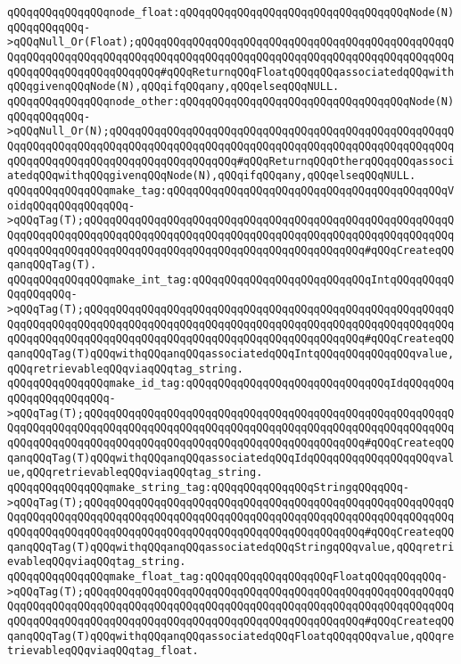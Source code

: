 \verb|qQQqqQQqqQQqqQQqnode_float:qQQqqQQqqQQqqQQqqQQqqQQqqQQqqQQqqQQqNode(N)qQQqqQQqqQQq->qQQqNull_Or(Float);qQQqqQQqqQQqqQQqqQQqqQQqqQQqqQQqqQQqqQQqqQQqqQQqqQQqqQQqqQQqqQQqqQQqqQQqqQQqqQQqqQQqqQQqqQQqqQQqqQQqqQQqqQQqqQQqqQQqqQQqqQQqqQQqqQQqqQQqqQQqqQQq#qQQqReturnqQQqFloatqQQqqQQqassociatedqQQqwithqQQqgivenqQQqNode(N),qQQqifqQQqany,qQQqelseqQQqNULL.|\newline
\verb|qQQqqQQqqQQqqQQqnode_other:qQQqqQQqqQQqqQQqqQQqqQQqqQQqqQQqqQQqNode(N)qQQqqQQqqQQq->qQQqNull_Or(N);qQQqqQQqqQQqqQQqqQQqqQQqqQQqqQQqqQQqqQQqqQQqqQQqqQQqqQQqqQQqqQQqqQQqqQQqqQQqqQQqqQQqqQQqqQQqqQQqqQQqqQQqqQQqqQQqqQQqqQQqqQQqqQQqqQQqqQQqqQQqqQQqqQQqqQQqqQQqqQQq#qQQqReturnqQQqOtherqQQqqQQqassociatedqQQqwithqQQqgivenqQQqNode(N),qQQqifqQQqany,qQQqelseqQQqNULL.|\newline
\newline
\verb|qQQqqQQqqQQqqQQqmake_tag:qQQqqQQqqQQqqQQqqQQqqQQqqQQqqQQqqQQqqQQqqQQqVoidqQQqqQQqqQQqqQQq->qQQqTag(T);qQQqqQQqqQQqqQQqqQQqqQQqqQQqqQQqqQQqqQQqqQQqqQQqqQQqqQQqqQQqqQQqqQQqqQQqqQQqqQQqqQQqqQQqqQQqqQQqqQQqqQQqqQQqqQQqqQQqqQQqqQQqqQQqqQQqqQQqqQQqqQQqqQQqqQQqqQQqqQQqqQQqqQQqqQQqqQQqqQQqqQQq#qQQqCreateqQQqanqQQqTag(T).|\newline
\verb|qQQqqQQqqQQqqQQqmake_int_tag:qQQqqQQqqQQqqQQqqQQqqQQqqQQqIntqQQqqQQqqQQqqQQqqQQq->qQQqTag(T);qQQqqQQqqQQqqQQqqQQqqQQqqQQqqQQqqQQqqQQqqQQqqQQqqQQqqQQqqQQqqQQqqQQqqQQqqQQqqQQqqQQqqQQqqQQqqQQqqQQqqQQqqQQqqQQqqQQqqQQqqQQqqQQqqQQqqQQqqQQqqQQqqQQqqQQqqQQqqQQqqQQqqQQqqQQqqQQqqQQqqQQq#qQQqCreateqQQqanqQQqTag(T)qQQqwithqQQqanqQQqassociatedqQQqIntqQQqqQQqqQQqqQQqvalue,qQQqretrievableqQQqviaqQQqtag_string.|\newline
\verb|qQQqqQQqqQQqqQQqmake_id_tag:qQQqqQQqqQQqqQQqqQQqqQQqqQQqqQQqIdqQQqqQQqqQQqqQQqqQQqqQQq->qQQqTag(T);qQQqqQQqqQQqqQQqqQQqqQQqqQQqqQQqqQQqqQQqqQQqqQQqqQQqqQQqqQQqqQQqqQQqqQQqqQQqqQQqqQQqqQQqqQQqqQQqqQQqqQQqqQQqqQQqqQQqqQQqqQQqqQQqqQQqqQQqqQQqqQQqqQQqqQQqqQQqqQQqqQQqqQQqqQQqqQQqqQQqqQQq#qQQqCreateqQQqanqQQqTag(T)qQQqwithqQQqanqQQqassociatedqQQqIdqQQqqQQqqQQqqQQqqQQqvalue,qQQqretrievableqQQqviaqQQqtag_string.|\newline
\verb|qQQqqQQqqQQqqQQqmake_string_tag:qQQqqQQqqQQqqQQqStringqQQqqQQq->qQQqTag(T);qQQqqQQqqQQqqQQqqQQqqQQqqQQqqQQqqQQqqQQqqQQqqQQqqQQqqQQqqQQqqQQqqQQqqQQqqQQqqQQqqQQqqQQqqQQqqQQqqQQqqQQqqQQqqQQqqQQqqQQqqQQqqQQqqQQqqQQqqQQqqQQqqQQqqQQqqQQqqQQqqQQqqQQqqQQqqQQqqQQqqQQq#qQQqCreateqQQqanqQQqTag(T)qQQqwithqQQqanqQQqassociatedqQQqStringqQQqvalue,qQQqretrievableqQQqviaqQQqtag_string.|\newline
\verb|qQQqqQQqqQQqqQQqmake_float_tag:qQQqqQQqqQQqqQQqqQQqFloatqQQqqQQqqQQq->qQQqTag(T);qQQqqQQqqQQqqQQqqQQqqQQqqQQqqQQqqQQqqQQqqQQqqQQqqQQqqQQqqQQqqQQqqQQqqQQqqQQqqQQqqQQqqQQqqQQqqQQqqQQqqQQqqQQqqQQqqQQqqQQqqQQqqQQqqQQqqQQqqQQqqQQqqQQqqQQqqQQqqQQqqQQqqQQqqQQqqQQqqQQqqQQq#qQQqCreateqQQqanqQQqTag(T)qQQqwithqQQqanqQQqassociatedqQQqFloatqQQqqQQqvalue,qQQqretrievableqQQqviaqQQqtag_float.|\newline
